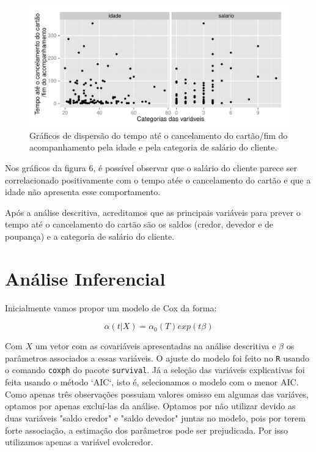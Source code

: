\documentclass{article}\usepackage[]{graphicx}\usepackage[]{color}
\makeatletter
\def\maxwidth{ %
  \ifdim\Gin@nat@width>\linewidth
    \linewidth
  \else
    \Gin@nat@width
  \fi
}
\newenvironment{knitrout}{}{} %
\makeatother
\begin{document}
\begin{figure}[t!]
\centering
\begin{knitrout}
\color{fgcolor}
\includegraphics[width=\maxwidth]{figure/unnamed-chunk-6} 

\end{knitrout}
\caption{Gráficos de dispersão do tempo até o cancelamento do cartão/fim do acompanhamento pela idade e pela categoria de salário do cliente.}
\end{figure}

Nos gráficos da figura 6, é possível observar que o salário do cliente parece ser correlacionado positivamente com o tempo atée o cancelamento do cartão e que a idade não apresenta esse comportamento.

Após a análise descritiva, acreditamos que as principais variáveis para prever o tempo até o cancelamento do cartão são os saldos (credor, devedor e de poupança) e a categoria de salário do cliente. 

\section{Análise Inferencial}

Inicialmente vamos propor um modelo de Cox da forma:

$$\alpha(t|X) = \alpha_0(T)exp(t\beta)$$

Com $X$ um vetor com as covariáveis apresentadas na análise descritiva e $\beta$ os parâmetros associados a essas variáveis.
O ajuste do modelo foi feito no \texttt{R} usando o comando \texttt{coxph} do pacote \texttt{survival}. Já a seleção das variáveis explicativas foi feita usando o método `AIC`, isto é, selecionamos o modelo com o menor AIC. Como apenas três observações possuiam valores omisso em algumas das variáves, optamos por apenas excluí-las da análise. Optamos por não utilizar devido as duas variáveis "saldo credor" e "saldo devedor" juntas no modelo, pois por terem forte associação, a estimação dos parâmetros pode ser prejudicada. Por isso utilizamos apenas a variável evolcredor.
\end{document}
